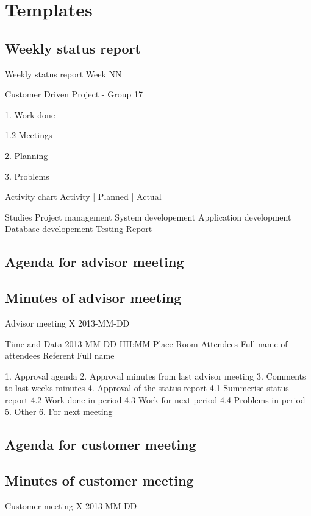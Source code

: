 \chapter{Templates}
\label{AppendixC} 

\section{Weekly status report}

Weekly status report
Week NN

Customer Driven Project - Group 17

1. Work done

1.2 Meetings

2. Planning

3. Problems

Activity chart
Activity | Planned | Actual

Studies
Project management
System developement
Application development
Database developement
Testing
Report 

\section{Agenda for advisor meeting}

\section{Minutes of advisor meeting}

Advisor meeting X 
2013-MM-DD

Time and Data 	2013-MM-DD HH:MM
Place 			Room
Attendees  		Full name of attendees
Referent 		Full name

1. Approval agenda
2. Approval minutes from last advisor meeting
3. Comments to last weeks minutes
4. Approval of the status report
4.1 Summerise status report
4.2 Work done in period
4.3 Work for next period
4.4 Problems in period
5.  Other
6. For next meeting


\section{Agenda for customer meeting}

\section{Minutes of customer meeting}

Customer meeting X 
2013-MM-DD

